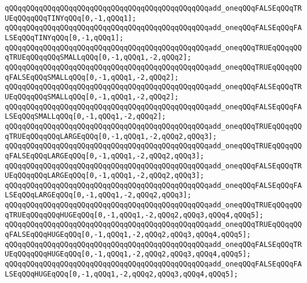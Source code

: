 \verb|qQQqqQQqqQQqqQQqqQQqqQQqqQQqqQQqqQQqqQQqqQQqqQQqadd_oneqQQqFALSEqQQqTRUEqQQqqQQqTINYqQQq[0,-1,qQQq1];|\newline
\verb|qQQqqQQqqQQqqQQqqQQqqQQqqQQqqQQqqQQqqQQqqQQqqQQqadd_oneqQQqFALSEqQQqFALSEqQQqTINYqQQq[0,-1,qQQq1];|\newline
\newline
\verb|qQQqqQQqqQQqqQQqqQQqqQQqqQQqqQQqqQQqqQQqqQQqqQQqadd_oneqQQqTRUEqQQqqQQqTRUEqQQqqQQqSMALLqQQq[0,-1,qQQq1,-2,qQQq2];|\newline
\verb|qQQqqQQqqQQqqQQqqQQqqQQqqQQqqQQqqQQqqQQqqQQqqQQqadd_oneqQQqTRUEqQQqqQQqFALSEqQQqSMALLqQQq[0,-1,qQQq1,-2,qQQq2];|\newline
\verb|qQQqqQQqqQQqqQQqqQQqqQQqqQQqqQQqqQQqqQQqqQQqqQQqadd_oneqQQqFALSEqQQqTRUEqQQqqQQqSMALLqQQq[0,-1,qQQq1,-2,qQQq2];|\newline
\verb|qQQqqQQqqQQqqQQqqQQqqQQqqQQqqQQqqQQqqQQqqQQqqQQqadd_oneqQQqFALSEqQQqFALSEqQQqSMALLqQQq[0,-1,qQQq1,-2,qQQq2];|\newline
\newline
\verb|qQQqqQQqqQQqqQQqqQQqqQQqqQQqqQQqqQQqqQQqqQQqqQQqadd_oneqQQqTRUEqQQqqQQqTRUEqQQqqQQqLARGEqQQq[0,-1,qQQq1,-2,qQQq2,qQQq3];|\newline
\verb|qQQqqQQqqQQqqQQqqQQqqQQqqQQqqQQqqQQqqQQqqQQqqQQqadd_oneqQQqTRUEqQQqqQQqFALSEqQQqLARGEqQQq[0,-1,qQQq1,-2,qQQq2,qQQq3];|\newline
\verb|qQQqqQQqqQQqqQQqqQQqqQQqqQQqqQQqqQQqqQQqqQQqqQQqadd_oneqQQqFALSEqQQqTRUEqQQqqQQqLARGEqQQq[0,-1,qQQq1,-2,qQQq2,qQQq3];|\newline
\verb|qQQqqQQqqQQqqQQqqQQqqQQqqQQqqQQqqQQqqQQqqQQqqQQqadd_oneqQQqFALSEqQQqFALSEqQQqLARGEqQQq[0,-1,qQQq1,-2,qQQq2,qQQq3];|\newline
\newline
\verb|qQQqqQQqqQQqqQQqqQQqqQQqqQQqqQQqqQQqqQQqqQQqqQQqadd_oneqQQqTRUEqQQqqQQqTRUEqQQqqQQqHUGEqQQq[0,-1,qQQq1,-2,qQQq2,qQQq3,qQQq4,qQQq5];|\newline
\verb|qQQqqQQqqQQqqQQqqQQqqQQqqQQqqQQqqQQqqQQqqQQqqQQqadd_oneqQQqTRUEqQQqqQQqFALSEqQQqHUGEqQQq[0,-1,qQQq1,-2,qQQq2,qQQq3,qQQq4,qQQq5];|\newline
\verb|qQQqqQQqqQQqqQQqqQQqqQQqqQQqqQQqqQQqqQQqqQQqqQQqadd_oneqQQqFALSEqQQqTRUEqQQqqQQqHUGEqQQq[0,-1,qQQq1,-2,qQQq2,qQQq3,qQQq4,qQQq5];|\newline
\verb|qQQqqQQqqQQqqQQqqQQqqQQqqQQqqQQqqQQqqQQqqQQqqQQqadd_oneqQQqFALSEqQQqFALSEqQQqHUGEqQQq[0,-1,qQQq1,-2,qQQq2,qQQq3,qQQq4,qQQq5];|\newline
\newline
